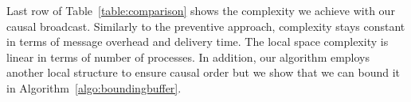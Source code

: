 

Last row of Table~\ref{table:comparison} shows the complexity we achieve with
our causal broadcast. Similarly to the preventive approach, complexity stays
constant in terms of message overhead and delivery time. The local space
complexity is linear in terms of number of processes.  In addition, our algorithm employs another
local structure to ensure causal order but we show that we can bound it in
Algorithm~\ref{algo:boundingbuffer}.



